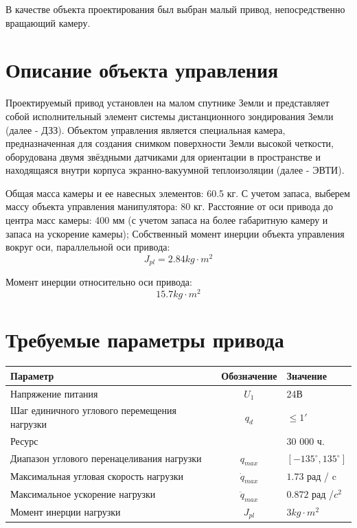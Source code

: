 В качестве объекта проектирования был выбран малый привод, непосредственно вращающий камеру.

\section{Описание объекта управления}
Проектируемый привод установлен на малом спутнике Земли и представляет собой
исполнительный элемент системы дистанционного зондирования Земли (далее - ДЗЗ).
Объектом управления является специальная камера, предназначенная для создания
снимком поверхности Земли высокой четкости, оборудована двумя звёздными
датчиками для ориентации в пространстве и находящаяся внутри корпуса
экранно-вакуумной теплоизоляции (далее - ЭВТИ).

Общая масса камеры и ее навесных элементов: 60.5 кг. С учетом запаса, выберем
массу объекта управления манипулятора: 80 кг.
Расстояние от оси привода до центра масс камеры: 400 мм (с учетом запаса
на более габаритную камеру и запаса на ускорение камеры);
Собственный момент инерции объекта управления вокруг оси, параллельной оси привода:
$$
    J_{pl} = 2.84 kg \cdot m^2
$$

Момент инерции относительно оси привода:
$$
    15.7 kg \cdot m^2
$$


\section{Требуемые параметры привода}

\begin{tabular}{|l|c|l|}
\hline
Параметр                                    & Обозначение      & Значение                   \\
\hline
Напряжение питания                          & $U_1$            & 24В                        \\
Шаг единичного углового перемещения нагрузки& $q_d$            & $ \le 1' $                 \\
Ресурс                                      &                  & 30 000 ч.                  \\
Диапазон углового перенацеливания нагрузки  & $q_{max}$        & $[-135^\circ, 135^\circ] $ \\
Максимальная угловая скорость нагрузки      & $\dot{q}_{max}$  & $1.73$ рад / c             \\
Максимальное ускорение нагрузки             & $\ddot{q}_{max}$ & $0.872$ рад /$c^2$         \\
Момент инерции нагрузки                     & $J_{pl}$         & $3 kg \cdot m^2 $          \\
\hline
\end{tabular}

\endinput

